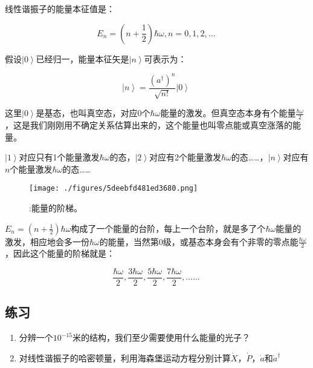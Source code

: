 线性谐振子的能量本征值是：

\begin{equation}
E_n = \left( n + \frac{1}{2} \right) \hbar \omega, n = 0, 1, 2, ...~
\end{equation}

假设$\left| 0 \right\rangle$已经归一，能量本征矢是$\left| n \right\rangle$可表示为：

\begin{equation}
\left| n \right\rangle = \frac{ \left( a^\dagger \right)^n }{\sqrt{n !}} \left| 0 \right\rangle~
\end{equation}

这里$\left| 0 \right\rangle$是基态，也叫真空态，对应0个$\hbar \omega$能量的激发。但真空态本身有个能量$\frac{\hbar \omega}{2}$，这是我们刚刚用不确定关系估算出来的，这个能量也叫零点能或真空涨落的能量。

$\left| 1 \right\rangle$对应只有1个能量激发$\hbar \omega$的态，$\left| 2 \right\rangle$对应有2个能量激发$\hbar \omega$的态……，$\left| n \right\rangle$对应有$n$个能量激发$\hbar \omega$的态……

\begin{figure}[ht]
\centering
\texttt{[image: ./figures/5deebfd481ed3680.png]}
\caption{:能量的阶梯。} \label{fig_QMPre4_3}
\end{figure}

$E_n = \left( n + \frac{1}{2}  \right) \hbar \omega$构成了一个能量的台阶，每上一个台阶，就是多了个$\hbar \omega$能量的激发，相应地会多一份$\hbar \omega$的能量，当然第0级，或基态本身会有个非零的零点能$\frac{\hbar \omega}{2}$，因此这个能量的阶梯就是：

\begin{equation}
\frac{\hbar \omega}{2}, \frac{3 \hbar \omega}{2}, \frac{5 \hbar \omega}{2}, \frac{7 \hbar \omega}{2}, ......~
\end{equation}

\subsection*{练习}

\begin{enumerate}
\item 

分辨一个$10^{-15}$米的结构，我们至少需要使用什么能量的光子？

\item

对线性谐振子的哈密顿量，利用海森堡运动方程分别计算$\dot X$，$\dot P$，$\dot a$和$\dot a^\dagger$

\end{enumerate}
